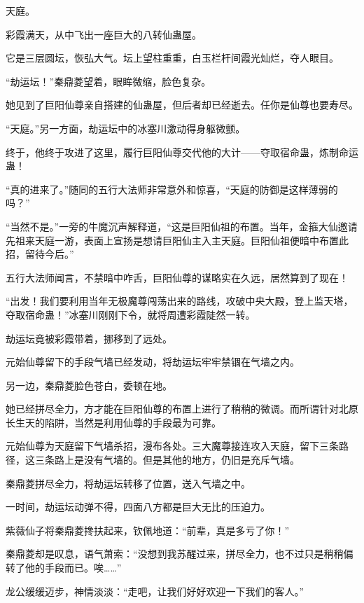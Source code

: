 
\begin{this_body}

天庭。

彩霞满天，从中飞出一座巨大的八转仙蛊屋。

它是三层圆坛，恢弘大气。坛上望柱重重，白玉栏杆间霞光灿烂，夺人眼目。

“劫运坛！”秦鼎菱望着，眼眸微缩，脸色复杂。

她见到了巨阳仙尊亲自搭建的仙蛊屋，但后者却已经逝去。任你是仙尊也要寿尽。

“天庭。”另一方面，劫运坛中的冰塞川激动得身躯微颤。

终于，他终于攻进了这里，履行巨阳仙尊交代他的大计——夺取宿命蛊，炼制命运蛊！

“真的进来了。”随同的五行大法师非常意外和惊喜，“天庭的防御是这样薄弱的吗？”

“当然不是。”一旁的牛魔沉声解释道，“这是巨阳仙祖的布置。当年，金箍大仙邀请先祖来天庭一游，表面上宣扬是想请巨阳仙主入主天庭。巨阳仙祖便暗中布置此招，留待今后。”

五行大法师闻言，不禁暗中咋舌，巨阳仙尊的谋略实在久远，居然算到了现在！

“出发！我们要利用当年无极魔尊闯荡出来的路线，攻破中央大殿，登上监天塔，夺取宿命蛊！”冰塞川刚刚下令，就将周遭彩霞陡然一转。

劫运坛竟被彩霞带着，挪移到了远处。

元始仙尊留下的手段气墙已经发动，将劫运坛牢牢禁锢在气墙之内。

另一边，秦鼎菱脸色苍白，委顿在地。

她已经拼尽全力，方才能在巨阳仙尊的布置上进行了稍稍的微调。而所谓针对北原长生天的陷阱，当然是利用仙尊的手段最为可靠。

元始仙尊为天庭留下气墙杀招，漫布各处。三大魔尊接连攻入天庭，留下三条路径，这三条路上是没有气墙的。但是其他的地方，仍旧是充斥气墙。

秦鼎菱拼尽全力，将劫运坛转移了位置，送入气墙之中。

一时间，劫运坛动弹不得，四面八方都是巨大无比的压迫力。

紫薇仙子将秦鼎菱搀扶起来，钦佩地道：“前辈，真是多亏了你！”

秦鼎菱却是叹息，语气萧索：“没想到我苏醒过来，拼尽全力，也不过只是稍稍偏转了他的手段而已。唉……”

龙公缓缓迈步，神情淡淡：“走吧，让我们好好欢迎一下我们的客人。”


\end{this_body}
